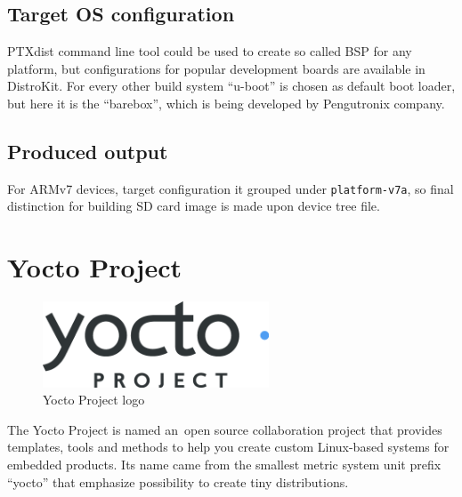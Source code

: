\documentclass[printmode]{mgr}
\begin{document}
\subsection*{Target OS configuration}

PTXdist command line tool could be used to create so called BSP for any platform, but configurations for popular development boards are available in DistroKit.
For every other build system ``u-boot'' is chosen as default boot loader, but here it is the ``barebox'', which is being developed by Pengutronix company.

\subsection*{Produced output}

For ARMv7 devices, target configuration it grouped under \verb|platform-v7a|, so final distinction for building SD card image is made upon device tree file.





\section{Yocto Project}

\begin{figure}[htbp]
  \centering
    \includegraphics[width=0.6\textwidth]{yoctoproject-logo.png}
    \caption{Yocto Project logo}
  \label{fig:yoctoproject-logo}
\end{figure}

The Yocto Project is named an~open source collaboration project that provides templates, tools and methods to help you create custom Linux-based systems for embedded products. Its name came from the smallest metric system unit prefix ``yocto'' that emphasize possibility to create tiny distributions.
\end{document}
